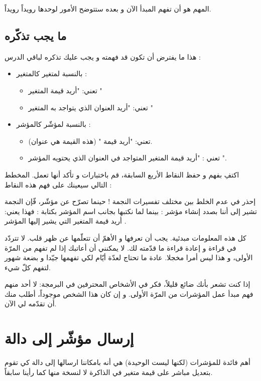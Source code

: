 المهم هو أن تفهم المبدأ الآن و بعده ستتوضح الأمور لوحدها رويداً رويداً.

\subsection{ما يجب تذكّره}
هذا ما يفترض أن تكون قد فهمته و يجب عليك تذكره لباقي الدرس :
\begin{itemize}
	\item بالنسبة لمتغير كالمتغير
 :
	\begin{itemize}
		\item {} تعني: "أريد قيمة المتغير
"
		\item {}
تعني: "أريد العنوان الذي يتواجد به المتغير
"
	\end{itemize}
	\item بالنسبة لمؤشّر كالمؤشر
 :
	\begin{itemize}
		\item {}
تعني: "أريد قيمة
"
(هذه القيمة هي عنوان).
		\item {}
تعني : "أريد قيمة المتغير المتواجد في العنوان الذي يحتويه المؤشر
".
	\end{itemize}
\end{itemize}
اكتفِ بفهم و حفظ النقاط الأربع السابقة، قم باختبارات و تأكد أنها تعمل. المخطط التالي سيعينك على فهم هذه النقاط :
\begin{warning}
إحذر في عدم الخلط بين مختلف تفسيرات النجمة ! حينما تصرّح عن مؤشّر، فّإن النجمة تشير إلى أننا بصدد إنشاء مؤشر :
بينما لما نكتبها بجانب اسم المؤشر بكتابة :
فهذا يعني: أريد قيمة المتغير التي يشير إليها المؤشر
.
\end{warning}
كل هذه المعلومات مبدئية. يجب أن تعرفها و الأهمّ أن تتعلّمها عن ظهر قلب. لا تتردّد في قراءة و إعادة قراءة ما قدّمته لك. لا يمكنني أن أعاتبك إذا لم تفهم من المرّة الأولى، و هذا ليس أمرا مخجلا. عادة ما تحتاج لعدّة أيّام لكي تفهمها جيّدا و بضعة شهور لتفهم كلّ شيء.

إذا كنت تشعر بأنك ضائع قليلاً، فكر في الأشخاص المحترفين في البرمجة:  لا أحد منهم فهم مبدأ عمل المؤشرات من المرّة الأولى. و إن كان هذا الشخص موجوداً، أطلب منك أن تقدّمه لي الآن.

\section{إرسال مؤشّر إلى دالة}
أهم فائدة للمؤشرات (لكنها ليست الوحيدة) هي أنه بامكاننا ارسالها إلى دالة كي تقوم بتعديل مباشر على قيمة متغير في الذاكرة لا لنسخة منها كما رأينا سابقاً.

